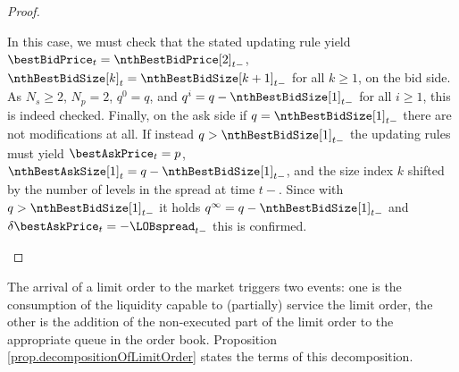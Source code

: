 \begin{proof}
\begin{enumerate}[label={\emph{\roman{*}}.}]
  In this case, we must check that the stated updating rule yield
  $\bestBidPrice_t = \nthBestBidPrice[2]_{t-}$,
  $\nthBestBidSize[k]_t = \nthBestBidSize[k+1]_{t-}$ for all $k\geq 1$, on the bid side.
  As $N_s\geq 2$, $N_p=2$, $q^0 = q$, and $q^i = q-\nthBestBidSize[1]_{t-}$ for all $i\geq 1$,
  this is indeed checked.
  Finally, on the ask side if $q=\nthBestBidSize[1]_{t-}$ there are not modifications at all.
  If instead $q>\nthBestBidSize[1]_{t-}$ the updating rules must yield
  $\bestAskPrice_t = p$, $\nthBestAskSize[1]_t = q-\nthBestBidSize[1]_{t-}$,
  and the size index $k$ shifted by the number of levels in the spread at time $t-$.
  Since with $q>\nthBestBidSize[1]_{t-}$ it holds $q^{\infty} = q-\nthBestBidSize[1]_{t-}$
  and $\delta\bestAskPrice_t = -\LOBspread_{t-}$ this is confirmed.
 \end{enumerate}
\end{proof}

The arrival of a limit order to the market triggers two events:
one is the consumption of the liquidity capable to (partially) service the limit order,
the other is the addition of the non-executed part of the limit order
to the appropriate queue in the order book.
Proposition \ref{prop.decompositionOfLimitOrder} states the terms of this decomposition.

